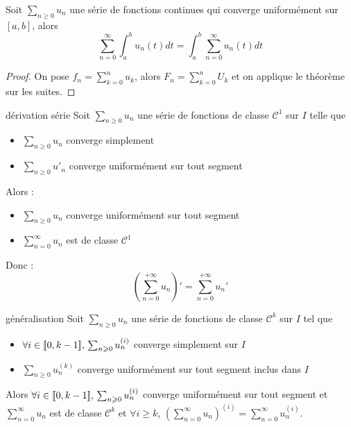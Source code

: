 \begin{corollaire}{}{}
    Soit $\sum_{n \geqslant 0} u_n$ une série de fonctions continues qui converge uniformément sur 
    $[a, b]$, alors 
    $$\sum_{n = 0}^{\infty} \int_{a}^{b} u_n(t) dt = \int_{a}^{b} \sum_{n = 0}^{\infty} u_n(t) dt$$
\end{corollaire}

\begin{proof}
    On pose $\displaystyle f_n = \sum_{k = 0}^n u_k$, alors $\displaystyle F_n = \sum_{k = 0 }^{n } U_k$ et on applique le 
    théorème sur les suites. 
\end{proof}

\begin{theoreme}{dérivation série}{}
    Soit $\sum_{n \geqslant 0} u_n$ une série de fonctions de classe $\mathscr{C}^1$ sur $I$ telle que
    \begin{itemize}
        \item $\sum_{n \geqslant 0} u_n$ converge simplement
        \item $\sum_{n \geqslant 0} u'_n$ converge uniformément sur tout segment
    \end{itemize}
    Alors : 
    \begin{itemize}
        \item $\sum_{n \geqslant 0} u_n$ converge uniformément sur tout segment
        \item $\displaystyle \sum_{n = 0 }^{\infty } u_n$ est de classe $\mathscr C^1$
    \end{itemize}
    Donc : 
    $$\left(\sum_{n = 0}^{+ \infty} u_n\right)' = \sum_{n = 0 }^{+ \infty } u_n'$$
\end{theoreme}

\begin{theoreme}{généralisation}{}
    Soit $\sum_{n \geqslant 0} u_n$ une série de fonctions de classe $\mathscr{C}^k$ sur $I$ tel que 
    \begin{itemize}
        \item $\forall i \in [\![0, k - 1]\!], \, \sum_{n \geqslant 0} u_n^{(i)}$ converge simplement sur $I$ 
        \item $\sum_{n \geqslant 0} u_n^{(k)}$ converge uniformément sur tout segment inclus dans $I$   
    \end{itemize}

    Alors $\forall i \in [\![0, k - 1]\!], \, \sum_{n \geqslant 0} u_n^{(i)}$ converge uniformément sur tout segment
    et $\displaystyle \sum_{n = 0}^{\infty} u_n$ est de classe $\mathscr{C}^k$ et 
    $\forall i \geqslant k$, $\displaystyle \left( \sum_{n = 0}^{\infty} u_n \right)^{(i)} = \sum_{n = 0}^{\infty} u_n^{(i)}$.
\end{theoreme}

